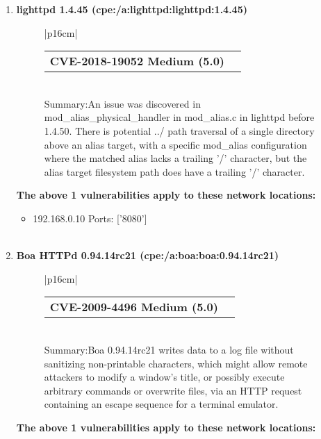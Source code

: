 \documentclass{article}
\begin{document}
\begin{enumerate}[wide, labelwidth=!, labelindent=0pt,
                        label=\textbf{\large \arabic{enumi} \large}]
                         \begin{itemize}
\item 192.168.0.10 Ports: ['3306']
\\ \\ 
 \end{itemize}
\item \textbf{\large lighttpd 1.4.45 (cpe:/a:lighttpd:lighttpd:1.4.45)  \large}\begin{figure}[h!]
\begin{tabular}{|p{16cm}|} \begin{tabular}{@{}p{15cm}>{\raggedleft\arraybackslash}
                           p{0.5cm}@{}}\textbf{CVE-2018-19052 Medium (5.0)} & \href{https://nvd.nist.gov/vuln/detail/CVE-2018-19052}{\large \faicon{link}}\end{tabular}\\
 Summary:An issue was discovered in mod_alias_physical_handler in mod_alias.c in lighttpd before 1.4.50. There is potential ../ path traversal of a single directory above an alias target, with a specific mod_alias configuration where the matched alias lacks a trailing '/' character, but the alias target filesystem path does have a trailing '/' character.\\ \hline \end{tabular}  \end{figure}
\FloatBarrier
\textbf{The above 1 vulnerabilities apply to these network locations:}

                         \begin{itemize}
\item 192.168.0.10 Ports: ['8080']
\\ \\ 
 \end{itemize}
\item \textbf{\large Boa HTTPd 0.94.14rc21 (cpe:/a:boa:boa:0.94.14rc21)  \large}\begin{figure}[h!]
\begin{tabular}{|p{16cm}|} \begin{tabular}{@{}p{15cm}>{\raggedleft\arraybackslash}
                           p{0.5cm}@{}}\textbf{CVE-2009-4496 Medium (5.0)} & \href{https://nvd.nist.gov/vuln/detail/CVE-2009-4496}{\large \faicon{link}}\end{tabular}\\
 Summary:Boa 0.94.14rc21 writes data to a log file without sanitizing non-printable characters, which might allow remote attackers to modify a window's title, or possibly execute arbitrary commands or overwrite files, via an HTTP request containing an escape sequence for a terminal emulator.\\ \hline \end{tabular}  \end{figure}
\FloatBarrier
\textbf{The above 1 vulnerabilities apply to these network locations:}


\end{enumerate}
\end{document}
